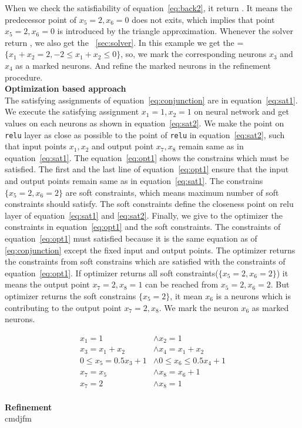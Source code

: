 When we check the satisfiability of equation~\ref{eq:back2}, it return \unsat{}. It means the predecessor point of 
$x_5=2,x_6=0$ does not exits, which implies that point $x_5=2, x_6=0$ is introduced by the triangle approximation.
Whenever the solver return \unsat{}, we also get the \unsatcore{}~\ref{sec:solver}. In this example we get the 
\unsatcore{}=$\{x_1+x_2=2, -2\leq  x_1+x_2 \leq 0\}$, so, we mark the corresponding neurons $x_3$ and $x_4$ as a marked neurons. 
And refine the marked neurons in the refinement procedure. 
\\
\textbf{Optimization based approach}\\
The satisfying assignments of equation~\ref{eq:conjunction} are in equation~\ref{eq:sat1}. 
We execute the satisfying assignment $x_1=1,x_2=1$ on neural network and get values on each neurons as 
shown in equation~\ref{eq:sat2}. We make the point on \texttt{relu} layer as close as possible 
to the point of \texttt{relu} in equation~\ref{eq:sat2}, such that input points $x_1,x_2$ and 
output point $x_7,x_8$ remain same as in equation~\ref{eq:sat1}. 
The equation~\ref{eq:opt1} shows the constrains which must be satisfied. The first and the last line of equation~\ref{eq:opt1}
ensure that the input and output points remain same as in equation~\ref{eq:sat1}. 
The constrains $\{x_5=2, x_6=2\}$ are soft constraints, which means maximum number of soft constraints should satisfy. 
The soft constraints define the closeness point on relu layer of equation~\ref{eq:sat1} and \ref{eq:sat2}. 
Finally, we give to the optimizer the constraints in equation~\ref{eq:opt1} and the soft constraints. 
The constraints of equation~\ref{eq:opt1} must satisfied because it is the same equation as of \ref{eq:conjunction}
except the fixed input and output points. 
The optimizer returns the constraints from soft constrains which are satisfied with the constraints 
of equation~\ref{eq:opt1}. If optimizer returns all soft constraints($\{x_5=2,x_6=2\}$) it means the output point
$x_7=2, x_8=1$ can be reached from $x_5=2,x_6=2$. But optimizer returns the soft constrains $\{x_5=2\}$, it mean 
$x_6$ is a neurons which is contributing to the output point $x_7=2, x_8$. We mark the neuron $x_6$ as 
marked neurons.  

\begin{equation}
    \begin{aligned}
        x_1 = 1 & \land x_2 = 1 \\
        x_3 = x_1 + x_2 & \land x_4 = x_1 + x_2 \\
        0 \leq x_5 = 0.5x_3 + 1 & \land 0\leq x_6 \leq 0.5x_4 + 1 \\ 
        x_7 = x_5 & \land x_8 = x_6 + 1 \\
        x_7 = 2 & \land x_8 = 1
    \end{aligned}
\label{eq:opt1}
\end{equation}
\\
\textbf{Refinement} \\
cmdjfm


